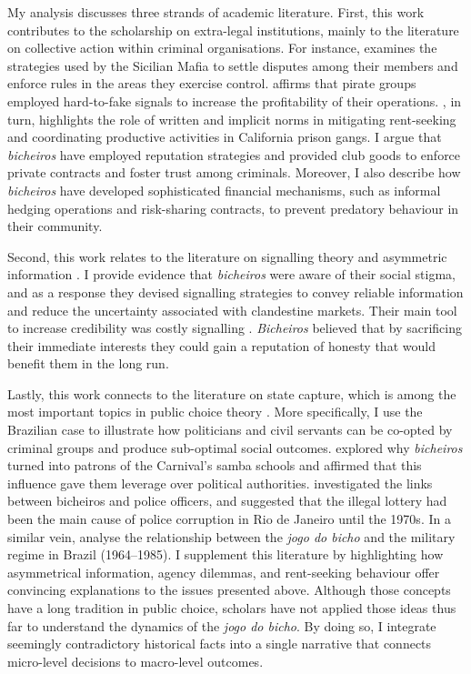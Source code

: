 \documentclass[a4paper,12pt]{article}
\begin{document}
My analysis discusses three strands of academic literature. First, this work contributes to the scholarship on extra-legal institutions, mainly to the literature on collective action within criminal organisations. For instance, \citet{gambetta1996sicilian} examines the strategies used by the Sicilian Mafia to settle disputes among their members and enforce rules in the areas they exercise control. \citet{leeson2009invisible,leeson2010pirational} affirms that pirate groups employed hard-to-fake signals to increase the profitability of their operations. \citet{skarbek2011governance,skarbek2012prison,skarbek2014social}, in turn, highlights the role of written and implicit norms in mitigating rent-seeking and coordinating productive activities in California prison gangs. I argue that \emph{bicheiros} have employed reputation strategies and provided club goods to enforce private contracts and foster trust among criminals. Moreover, I also describe how \emph{bicheiros} have developed sophisticated financial mechanisms, such as informal hedging operations and risk-sharing contracts, to prevent predatory behaviour in their community.

Second, this work relates to the literature on signalling theory and asymmetric information \citep[e.g.,][]{akerlof1970market,connelly2011signaling,spence1973job}. I provide evidence that \emph{bicheiros} were aware of their social stigma, and as a response they devised signalling strategies to convey reliable information and reduce the uncertainty associated with clandestine markets. Their main tool to increase credibility was costly signalling \citep{gambetta2009codes,kimbrough2015commitment, schelling1960strategy}. \emph{Bicheiros} believed that by sacrificing their immediate interests they could gain a reputation of honesty that would benefit them in the long run.  
 
Lastly, this work connects to the literature on state capture, which is among the most important topics in public choice theory \citep{rose1978corruption,shleifer2002grabbing,tollison1982rent}. More specifically, I use the Brazilian case to illustrate how politicians and civil servants can be co-opted by criminal groups and produce sub-optimal social outcomes. \citet{queiroz1992carnaval} explored why \emph{bicheiros} turned into patrons of the Carnival's samba schools and affirmed that this influence gave them leverage over political authorities. \citet{misse2007illegal} investigated the links between bicheiros and police officers, and suggested that the illegal lottery had been the main cause of police corruption in Rio de Janeiro until the 1970s. In a similar vein, \citet{jupiara2015poroes} analyse the relationship between the \emph{jogo do bicho} and the military regime in Brazil (1964--1985). I supplement this literature by highlighting how asymmetrical information, agency dilemmas, and rent-seeking behaviour offer convincing explanations to the issues presented above. Although those concepts have a long tradition in public choice, scholars have not applied those ideas thus far to understand the dynamics of the \emph{jogo do bicho}. By doing so, I integrate seemingly contradictory historical facts into a single narrative that connects micro-level decisions to macro-level outcomes.
\end{document}

